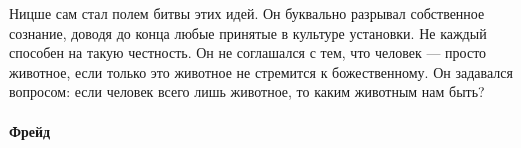 Ницше сам стал полем битвы этих идей. Он буквально разрывал собственное сознание, доводя до конца любые принятые в культуре установки. Не каждый способен на такую честность. Он не соглашался с тем, что человек --- просто животное, если только это животное не стремится к божественному. Он задавался вопросом: если человек всего лишь животное, то каким животным нам быть?

\paragraph{Фрейд}

